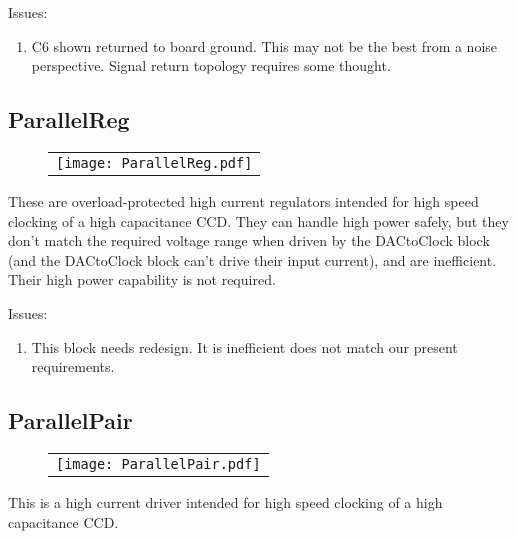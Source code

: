 \documentclass[a4paper,12pt]{article}
\begin{document}
Issues:
\begin{enumerate}
\item
C6 shown returned to board ground. This may not be the best from a noise perspective. Signal return topology requires some thought.
\end{enumerate}


\subsection{ParallelReg}
   \begin{figure}
   \begin{center}
   \begin{tabular}{c}
   \texttt{[image: ParallelReg.pdf]}
   \end{tabular}
   \end{center}
   \end{figure}

These are overload-protected high current regulators intended for high speed clocking of a high capacitance CCD. They can handle high power safely, but they don't match the required voltage range when driven by the DACtoClock block (and the DACtoClock block can't drive their input current), and are inefficient. Their high power capability is not required.

Issues:
\begin{enumerate}
\item
This block needs redesign. It is inefficient does not match our present requirements.
\end{enumerate}



\subsection{ParallelPair}

   \begin{figure}
   \begin{center}
   \begin{tabular}{c}
   \texttt{[image: ParallelPair.pdf]}
   \end{tabular}
   \end{center}
   \end{figure}

This is a high current driver intended for high speed clocking of a high capacitance CCD. 
\end{document}
